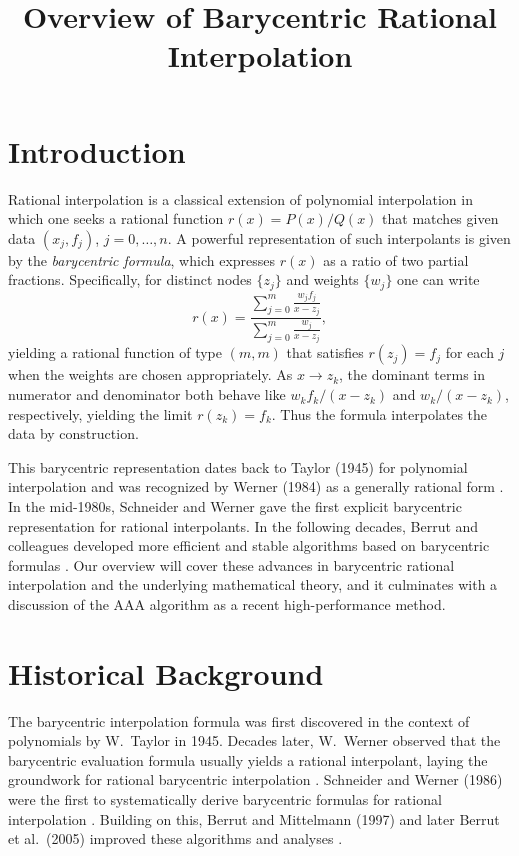 \documentclass{article}
\title{Overview of Barycentric Rational Interpolation}
\author{}
\date{}
\begin{document}
\maketitle

\section{Introduction}
Rational interpolation is a classical extension of polynomial interpolation in which one seeks a rational function $r(x)=P(x)/Q(x)$ that matches given data $(x_j,f_j)$, $j=0,\dots,n$.  A powerful representation of such interpolants is given by the \emph{barycentric formula}, which expresses $r(x)$ as a ratio of two partial fractions.  Specifically, for distinct nodes $\{z_j\}$ and weights $\{w_j\}$ one can write
\[
r(x) = \frac{\displaystyle\sum_{j=0}^m \frac{w_j f_j}{x - z_j}}
              {\displaystyle\sum_{j=0}^m \frac{w_j}{x - z_j}},
\]
yielding a rational function of type $(m,m)$ that satisfies $r(z_j)=f_j$ for each $j$ when the weights are chosen appropriately.  As $x\to z_k$, the dominant terms in numerator and denominator both behave like $w_kf_k/(x-z_k)$ and $w_k/(x-z_k)$, respectively, yielding the limit $r(z_k)=f_k$.  Thus the formula interpolates the data by construction.

This barycentric representation dates back to Taylor (1945) for polynomial interpolation and was recognized by Werner (1984) as a generally rational form \cite{BerrutBaltenspergerMittelmann2005}.  In the mid-1980s, Schneider and Werner \cite{SchneiderWerner1986} gave the first explicit barycentric representation for rational interpolants.  In the following decades, Berrut and colleagues developed more efficient and stable algorithms based on barycentric formulas \cite{BerrutMittelmann1997,BerrutBaltenspergerMittelmann2005}.  Our overview will cover these advances in barycentric rational interpolation and the underlying mathematical theory, and it culminates with a discussion of the AAA algorithm \cite{Nakatsukasa2018} as a recent high-performance method.

\section{Historical Background}
The barycentric interpolation formula was first discovered in the context of polynomials by W.~Taylor in 1945.  Decades later, W.~Werner observed that the barycentric evaluation formula usually yields a rational interpolant, laying the groundwork for rational barycentric interpolation \cite{BerrutBaltenspergerMittelmann2005}.  Schneider and Werner (1986) were the first to systematically derive barycentric formulas for rational interpolation \cite{SchneiderWerner1986}.  Building on this, Berrut and Mittelmann (1997) and later Berrut et al.\ (2005) improved these algorithms and analyses \cite{BerrutMittelmann1997,BerrutBaltenspergerMittelmann2005}.  
\end{document}
